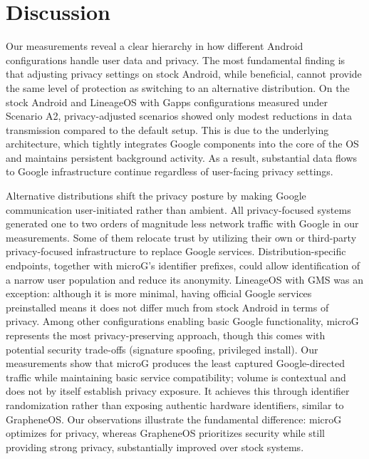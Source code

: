 \documentclass[runningheads]{llncs}
\begin{document}
\section{Discussion}

Our measurements reveal a clear hierarchy in how different Android configurations handle user data and privacy. The most fundamental finding is that adjusting privacy settings on stock Android, while beneficial, cannot provide the same level of protection as switching to an alternative distribution. On the stock Android and LineageOS with Gapps configurations measured under Scenario A2, privacy-adjusted scenarios showed only modest reductions in data transmission compared to the default setup. This is due to the underlying architecture, which tightly integrates Google components into the core of the OS and maintains persistent background activity. As a result, substantial data flows to Google infrastructure continue regardless of user-facing privacy settings.

Alternative distributions shift the privacy posture by making Google communication user-initiated rather than ambient. All privacy-focused systems generated one to two orders of magnitude less network traffic with Google in our measurements. Some of them relocate trust by utilizing their own or third-party privacy-focused infrastructure to replace Google services. Distribution-specific endpoints, together with microG's identifier prefixes, could allow identification of a narrow user population and reduce its anonymity. LineageOS with GMS was an exception: although it is more minimal, having official Google services preinstalled means it does not differ much from stock Android in terms of privacy. Among other configurations enabling basic Google functionality, microG represents the most privacy-preserving approach, though this comes with potential security trade-offs (signature spoofing, privileged install). Our measurements show that microG produces the least captured Google-directed traffic while maintaining basic service compatibility; volume is contextual and does not by itself establish privacy exposure. It achieves this through identifier randomization rather than exposing authentic hardware identifiers, similar to GrapheneOS. Our observations illustrate the fundamental difference: microG optimizes for privacy, whereas GrapheneOS prioritizes security while still providing strong privacy, substantially improved over stock systems.
\end{document}
